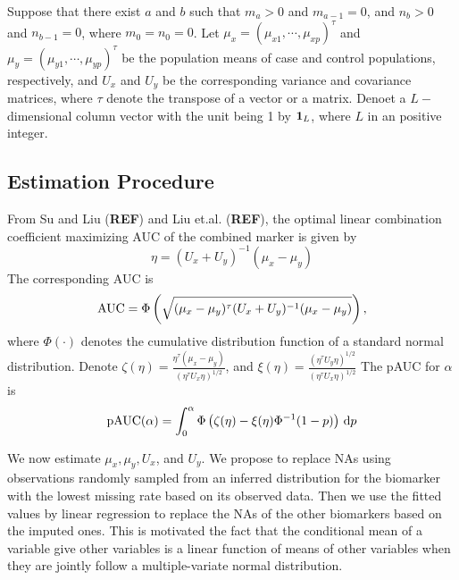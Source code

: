 \documentclass[a4,11pt,epsf, amssymb]{article}
\begin{document}
Suppose that there exist $a$ and $b$ such that $m_a>0$ and $m_{a-1}=0$, and $n_b>0$ and $n_{b-1}=0$, where $m_0=n_0=0$.
Let $\mu_x=(\mu_{x1},\cdots,\mu_{xp})^\tau$ and $\mu_y=(\mu_{y1},\cdots,\mu_{yp})^\tau$ be the population means of case and control populations, respectively, and $U_x$ and $U_y$ be the corresponding variance and covariance matrices, where $\tau$ denote the transpose of a vector or a matrix. Denoet a $L-$dimensional column vector with the unit being 1 by ${\bf 1}_L$, where $L$ in an positive integer.




\subsection{Estimation Procedure}

From  Su and Liu ({\bf REF}) and Liu et.al. ({\bf REF}), the optimal linear combination coefficient maximizing AUC of the combined marker is given by
$$\eta = (U_x + U_y)^{-1}(\mu_x - \mu_y)$$
The corresponding AUC is
$$\hbox{AUC} = \Phi\left(\sqrt{(\mu_x - \mu_y)^{\tau}(U_x + U_y)^{-1}(\mu_x - \mu_y)}\right),$$
where $\Phi(\cdot)$ denotes the cumulative distribution function of a standard normal distribution.
Denote $\zeta(\eta) = \frac{\eta^{\tau}(\mu_x - \mu_y)}{(\eta^{\tau}U_x\eta)^{1/2}}$, and
$\xi(\eta) = \frac{(\eta^{\tau}U_y\eta)^{1/2}}{(\eta^{\tau}U_x\eta)^{1/2}}$
The pAUC for $\alpha$ is
$$\hbox{pAUC}(\alpha) = \int_0^{\alpha}\Phi\left(\zeta(\eta)-\xi(\eta)\Phi^{-1}(1-p)\right)\,\hbox{d}p$$


We now  estimate $\mu_x,\mu_y,U_x$, and $U_y$.
We propose to replace NAs using observations randomly sampled from an inferred distribution for the biomarker with the lowest missing rate based on its observed data.
Then we use the fitted values by linear regression to replace the NAs of the other biomarkers based on the imputed ones. This is motivated the fact that the conditional mean of a variable give other variables is a linear function of
means of  other variables when they are jointly follow a multiple-variate normal distribution.
\end{document}
